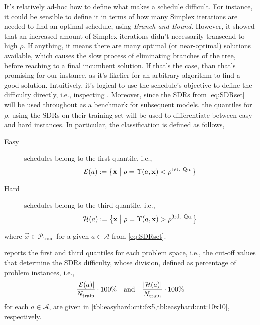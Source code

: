 It's relatively ad-hoc how to define what makes a schedule difficult. 
For instance, it could be sensible to define it in terms of how many Simplex 
iterations are needed to find an optimal schedule, using \emph{Branch and 
Bound}. However, it showed that an increased amount of Simplex iterations 
didn't necessarily transcend to high $\rho$. 
If anything, it means there are many optimal (or near-optimal) solutions 
available, which causes the slow process of eliminating branches of the tree, 
before reaching to a final incumbent solution. If that's the case, than that's 
promising for our instance, as it's likelier for an arbitrary algorithm to find 
a good solution. 
Intuitively, it's logical to use the schedule's objective to define the 
difficulty directly, i.e., inspecting \namerho. Moreover, since the SDRs from 
\cref{eq:SDRset} will be used throughout as a benchmark for subsequent models, 
the quantiles for $\rho$, using the SDRs on their training set will be used 
to differentiate between easy and hard instances. In particular, the 
classification is defined as follows, 
\begin{description}
  \item[Easy] schedules belong to the first quantile, i.e., \hfill \\
  \begin{equation}\label{eq:easy}
    \mathcal{E}(a):=\condset{\vec{x}}{
      \rho=\Upsilon(a,\vec{x})<\rho^{\text{1st. Qu.}}}
  \end{equation} 
  \item[Hard] schedules belong to the third quantile, i.e., \hfill \\
  \begin{equation}\label{eq:hard}
    \mathcal{H}(a):=\condset{\vec{x}}{
      \rho=\Upsilon(a,\vec{x})>\rho^{\text{3rd. Qu.}}}
  \end{equation} 
\end{description}
where $\vec{x}\in\mathcal{P}_{\text{train}}$ for a given $a\in\mathcal{A}$ from 
\cref{eq:SDRset}.

 

 reports the first and third quantiles for each 
problem space, i.e., the cut-off values that determine the SDRs difficulty, 
whose division, defined as percentage of problem instances, i.e., 
\begin{equation}\label{eq:easyhard:cnt}
  \frac{\abs{\mathcal{E}(a)}}{N_{\text{train}}} \cdot 100\%
  \quad \text{and} \quad 
  \frac{\abs{\mathcal{H}(a)}}{N_{\text{train}}}\cdot 100\%
\end{equation}
for each $a\in\mathcal{A}$, are given in \cref{tbl:easyhard:cnt:6x5,tbl:easyhard:cnt:10x10}, respectively. 

